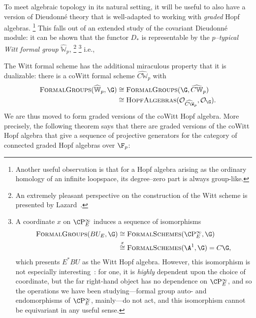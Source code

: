 To meet algebraic topology in its natural setting, it will be useful to also have a version of Dieudonn\'e theory that is well-adapted to working with \emph{graded} Hopf algebras.%
\footnote{%
Another useful observation is that for a Hopf algebra arising as the ordinary homology of an infinite loopspace, its degree--zero part is always group-like.
}
This falls out of an extended study of the covariant Dieudonn\'e module: it can be shown that the functor $D_*$ is representable by the \textit{$p$--typical Witt formal group} $\widehat{\mathbb W}_p$,%
\footnote{%
An extremely pleasant perspective on the construction of the Witt scheme is presented by Lazard~\cite[Chapter III]{LazardCFGs}.
}%
\footnote{%
A coordinate \(x\) on \(\CP^\infty_E\) induces a sequence of isomorphisms
\begin{align*}
\CatOf{FormalGroups}(BU_E, \G) & \cong \CatOf{FormalSchemes}(\CP^\infty_E, \G) \\
& \stackrel{x}{\cong} \CatOf{FormalSchemes}(\A^1, \G) = C\G,
\end{align*}
which presents \(E^* BU\) as the Witt Hopf algebra.
However, this isomorphism is not especially interesting~\cite[Remark 18.1]{StricklandFPFP}: for one, it is \emph{highly} dependent upon the choice of coordinate, but the far right-hand object has no dependence on \(\CP^\infty_E\), and so the operations we have been studying---formal group auto- and endomorphisms of \(\CP^\infty_E\), mainly---do not act, and this isomorphism cannot be equivariant in any useful sense.
}
i.e.,
\begin{center}
\end{center}
The Witt formal scheme has the additional miraculous property that it is dualizable: there is a coWitt formal scheme $\widehat{C\mathbb W}_p$ with
\begin{align*}
\CatOf{FormalGroups}(\widehat{\mathbb W}_p, \G) & \cong \CatOf{FormalGroups}(\G, \widehat{C\mathbb W}_p) \\
& \cong \CatOf{HopfAlgebras}(\sheaf O_{\widehat{C\W}_p}, \sheaf O_{\G}).
\end{align*}
We are thus moved to form graded versions of the coWitt Hopf algebra.
More precisely, the following theorem says that there are graded versions of the coWitt Hopf algebra that give a sequence of projective generators for the category of connected graded Hopf algebras over \(\F_p\):

